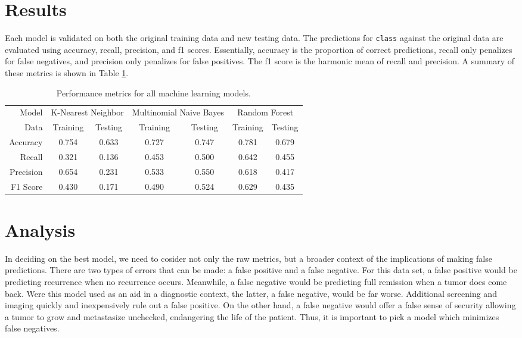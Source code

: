 \documentclass{article}
\begin{document}
\section{Results}

Each model is validated on both the original training data and new testing data. The predictions for \verb|class| against the original data are evaluated using accuracy, recall, precision, and f1 scores. Essentially, accuracy is the proportion of correct predictions, recall only penalizes for false negatives, and precision only penalizes for false positives. The f1 score is the harmonic mean of recall and precision. A summary of these metrics is shown in Table \ref{tbl:performance}.

\begin{table}
	\centering
	\caption{Performance metrics for all machine learning models.}
	\label{tbl:performance}
	\begin{tabular}{r||cc|cc|cc}
		Model & \multicolumn{2}{c|}{K-Nearest Neighbor} & \multicolumn{2}{c|}{Multinomial Naive Bayes} & \multicolumn{2}{c}{Random Forest} \\
		Data & Training & Testing & Training & Testing & Training & Testing \\
		\hline
		Accuracy & 0.754 & 0.633 & 0.727 & 0.747 & 0.781 & 0.679 \\
		Recall & 0.321 & 0.136 & 0.453 & 0.500 & 0.642 & 0.455 \\
		Precision & 0.654 & 0.231 & 0.533 & 0.550 & 0.618 & 0.417 \\
		F1 Score & 0.430 & 0.171 & 0.490 & 0.524 & 0.629 & 0.435
	\end{tabular}
\end{table}

\section{Analysis}

In deciding on the best model, we need to cosider not only the raw metrics, but a broader context of the implications of making false predictions. There are two types of errors that can be made: a false positive and a false negative. For this data set, a false positive would be predicting recurrence when no recurrence occurs. Meanwhile, a false negative would be predicting full remission when a tumor does come back. Were this model used as an aid in a diagnostic context, the latter, a false negative, would be far worse. Additional screening and imaging quickly and inexpensively rule out a false positive. On the other hand, a false negative would offer a false sense of security allowing a tumor to grow and metastasize unchecked, endangering the life of the patient. Thus, it is important to pick a model which minimizes false negatives.
\end{document}
